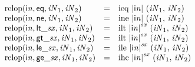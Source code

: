 $$
\begin{array}{@{}lcl@{}l@{}}
{\mathrm{relop}}({\mathsf{i}}{{\mathit{n}}}, \mathsf{eq}, {\mathit{iN}}_{{1}}, {\mathit{iN}}_{{2}}) &=& {\mathrm{ieq}}~{|{\mathsf{i}}{{\mathit{n}}}|}~({\mathit{iN}}_{{1}},\, {\mathit{iN}}_{{2}}) &  \\
{\mathrm{relop}}({\mathsf{i}}{{\mathit{n}}}, \mathsf{ne}, {\mathit{iN}}_{{1}}, {\mathit{iN}}_{{2}}) &=& {\mathrm{ine}}~{|{\mathsf{i}}{{\mathit{n}}}|}~({\mathit{iN}}_{{1}},\, {\mathit{iN}}_{{2}}) &  \\
{\mathrm{relop}}({\mathsf{i}}{{\mathit{n}}}, {\mathsf{lt\_}}{{\mathit{sx}}}, {\mathit{iN}}_{{1}}, {\mathit{iN}}_{{2}}) &=& {\mathrm{ilt}}~{{|{\mathsf{i}}{{\mathit{n}}}|}^{{\mathit{sx}}}}~({\mathit{iN}}_{{1}},\, {\mathit{iN}}_{{2}}) &  \\
{\mathrm{relop}}({\mathsf{i}}{{\mathit{n}}}, {\mathsf{gt\_}}{{\mathit{sx}}}, {\mathit{iN}}_{{1}}, {\mathit{iN}}_{{2}}) &=& {\mathrm{ilt}}~{{|{\mathsf{i}}{{\mathit{n}}}|}^{{\mathit{sx}}}}~({\mathit{iN}}_{{1}},\, {\mathit{iN}}_{{2}}) &  \\
{\mathrm{relop}}({\mathsf{i}}{{\mathit{n}}}, {\mathsf{le\_}}{{\mathit{sx}}}, {\mathit{iN}}_{{1}}, {\mathit{iN}}_{{2}}) &=& {\mathrm{ile}}~{{|{\mathsf{i}}{{\mathit{n}}}|}^{{\mathit{sx}}}}~({\mathit{iN}}_{{1}},\, {\mathit{iN}}_{{2}}) &  \\
{\mathrm{relop}}({\mathsf{i}}{{\mathit{n}}}, {\mathsf{ge\_}}{{\mathit{sx}}}, {\mathit{iN}}_{{1}}, {\mathit{iN}}_{{2}}) &=& {\mathrm{ihe}}~{{|{\mathsf{i}}{{\mathit{n}}}|}^{{\mathit{sx}}}}~({\mathit{iN}}_{{1}},\, {\mathit{iN}}_{{2}}) &  \\
\end{array}
$$


